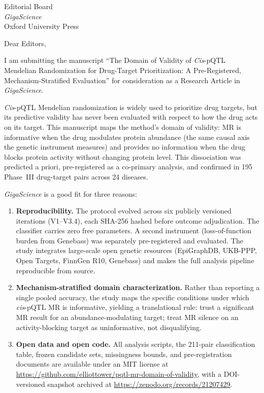 \documentclass[11pt]{letter}
\begin{document}
\begin{letter}{Editorial Board \\ \emph{GigaScience} \\ Oxford University Press}

\opening{Dear Editors,}

I am submitting the manuscript ``The Domain of Validity of \emph{Cis}-pQTL Mendelian Randomization for Drug-Target Prioritization: A Pre-Registered, Mechanism-Stratified Evaluation'' for consideration as a Research Article in \emph{GigaScience}.

\emph{Cis}-pQTL Mendelian randomization is widely used to prioritize drug targets, but its predictive validity has never been evaluated with respect to how the drug acts on its target. This manuscript maps the method's domain of validity: MR is informative when the drug modulates protein abundance (the same causal axis the genetic instrument measures) and provides no information when the drug blocks protein activity without changing protein level. This dissociation was predicted a priori, pre-registered as a co-primary analysis, and confirmed in 195 Phase~III drug-target pairs across 24 diseases.

\emph{GigaScience} is a good fit for three reasons:

\begin{enumerate}
\item \textbf{Reproducibility.} The protocol evolved across six publicly versioned iterations (V1--V3.4), each SHA-256 hashed before outcome adjudication. The classifier carries zero free parameters. A second instrument (loss-of-function burden from Genebass) was separately pre-registered and evaluated. The study integrates large-scale open genetic resources (EpiGraphDB, UKB-PPP, Open Targets, FinnGen R10, Genebass) and makes the full analysis pipeline reproducible from source.

\item \textbf{Mechanism-stratified domain characterization.} Rather than reporting a single pooled accuracy, the study maps the specific conditions under which \emph{cis}-pQTL MR is informative, yielding a translational rule: trust a significant MR result for an abundance-modulating target; treat MR silence on an activity-blocking target as uninformative, not disqualifying.

\item \textbf{Open data and open code.} All analysis scripts, the 211-pair classification table, frozen candidate sets, missingness bounds, and pre-registration documents are available under an MIT license at \url{https://github.com/elliottower/pqtl-mr-domain-of-validity}, with a DOI-versioned snapshot archived at \url{https://zenodo.org/records/21207429}.
\end{enumerate}


\end{letter}
\end{document}
